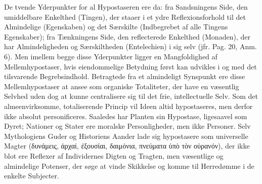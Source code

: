 \documentclass[12pt]{book}
\newcommand{\opage}[1]{\marginnote{\footnotesize\textit{[#1]}}}
\begin{document}
De tvende Yderpunkter for al Hypostaseren ere da: fra Sandsningens Side, den umiddelbare
Enkelthed (Tingen), der staaer i et ydre Reflexionsforhold til det Almindelige (Egenskaben)
\opage{186} og det Særskilte (Indbegrebet af alle Tingens Egenskaber); fra Tænkningens Side, den
reflecterede Enkelthed (Monaden), der har Almindeligheden og Særskiltheden (Entelechien)
i sig selv (jfr. Pag. 20, Anm. 6). Men imellem begge disse Yderpunkter ligger en
Mangfoldighed af Mellemhypostaser, hvis eiendommelige Betydning først kan udvikles i og
med det tilsvarende Begrebsindhold. Betragtede fra et almindeligt Synspunkt ere disse
Mellemhypostaser at ansee som organiske Totaliteter, der have en væsentlig Selvhed uden
dog at kunne centralisere sig til det frie, intellectuelle Selv. Som det almeenvirksomme,
totaliserende Princip vil Ideen altid hypostaseres, men derfor ikke absolut
personificeres. Saaledes har Planten sin Hypostase, ligesaavel som Dyret; Nationer og
Stater ere moralske Personligheder, men ikke Personer. Selv Mythologiens Guder og
Historiens Aander lade sig hypostasere som universelle Magter (δυνάμεις, ἀρχαί, ἐξουσίαι,
δαιμόνια, πνεύματα ὑπὸ τὸν οὐρανόν), der ikke blot ere Reflexer af Individernes Digten og
Tragten, men væsentlige og almindelige Potenser, der søge at vinde Skikkelse og komme til
Herredømme i de enkelte Subjecter.
\end{document}
